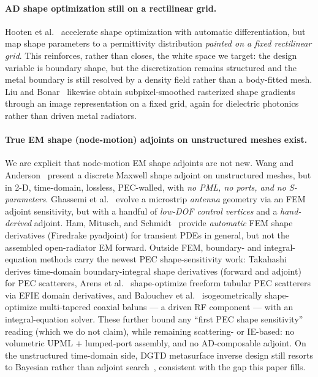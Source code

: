 \documentclass{anvil-paper}
\begin{document}
\paragraph{AD shape optimization still on a rectilinear grid.}
Hooten et al.~\cite{hooten2025} accelerate shape optimization with automatic
differentiation, but map shape parameters to a permittivity distribution
\emph{painted on a fixed rectilinear grid}. This reinforces, rather than closes,
the white space we target: the design variable is boundary shape, but the
discretization remains structured and the metal boundary is still resolved by a
density field rather than a body-fitted mesh. Liu and
Bonar~\cite{liu2024imagerep} likewise obtain subpixel-smoothed rasterized shape
gradients through an image representation on a fixed grid, again for dielectric
photonics rather than driven metal radiators.

\paragraph{True EM shape (node-motion) adjoints on unstructured meshes exist.}
We are explicit that node-motion EM shape adjoints are not new. Wang and
Anderson~\cite{wang2011} present a discrete Maxwell shape adjoint on
unstructured meshes, but in 2-D, time-domain, lossless, PEC-walled, with
\emph{no PML, no ports, and no S-parameters}. Ghassemi et
al.~\cite{ghassemi2013} evolve a microstrip \emph{antenna} geometry via an FEM
adjoint sensitivity, but with a handful of \emph{low-DOF control vertices} and a
\emph{hand-derived} adjoint. Ham, Mitusch, and Schmidt~\cite{ham2020} provide
\emph{automatic} FEM shape derivatives (Firedrake pyadjoint) for transient PDEs
in general, but not the assembled open-radiator EM forward. Outside FEM,
boundary- and integral-equation methods carry the newest PEC shape-sensitivity
work: Takahashi~\cite{takahashi2025tdbie} derives time-domain boundary-integral
shape derivatives (forward and adjoint) for PEC scatterers, Arens et
al.~\cite{arens2026tubular} shape-optimize freeform tubular PEC scatterers via
EFIE domain derivatives, and Balouchev et al.~\cite{balouchev2024balun}
isogeometrically shape-optimize multi-tapered coaxial baluns --- a driven RF
component --- with an integral-equation solver. These further bound any
``first PEC shape sensitivity'' reading (which we do not claim), while remaining
scattering- or IE-based: no volumetric UPML $+$ lumped-port assembly, and no
AD-composable adjoint. On the unstructured time-domain side, DGTD metasurface
inverse design still resorts to Bayesian rather than adjoint
search~\cite{gelly2026dgtd}, consistent with the gap this paper fills.
\end{document}
